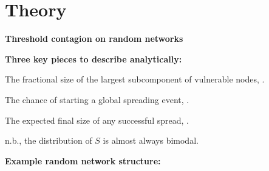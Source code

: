 
\section{Theory}

  \textbf{Threshold contagion on random networks}

  \textbf{\alert{Three key pieces} to describe analytically:}
    
    
      The fractional size of the largest subcomponent of vulnerable nodes, 
      \alertb{$\Svuln$}.
    
      The chance of starting a global spreading event, \alertb{$\Ptrig = \Strig$}.
    
      The expected final size of any successful spread, .
      
       n.b., the distribution of $S$ is almost always bimodal.
      

    
  


  \textbf{Example random network structure:}

